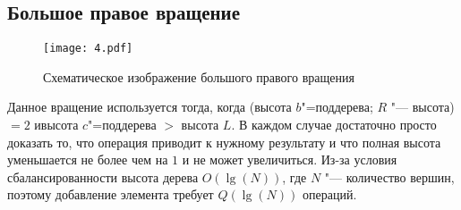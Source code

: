 \subsection*{Большое правое вращение}

\begin{figure}[ht]
    \texttt{[image: 4.pdf]}
    
    \caption{Схематическое изображение большого правого вращения}

\end{figure}

Данное вращение используется тогда, когда (высота $b$"=поддерева; $R$ "--- высота)
$= 2$ ивысота $c$"=поддерева $ > $ высота $L$.
В каждом случае достаточно просто доказать то, 
что операция приводит к нужному результату и
что полная высота уменьшается не более чем на $1$ и не может увеличиться.
Из-за условия сбалансированности высота дерева $O(\lg(N))$,
где $N$ "--- количество вершин, поэтому добавление элемента требует $Q(\lg(N))$ операций.